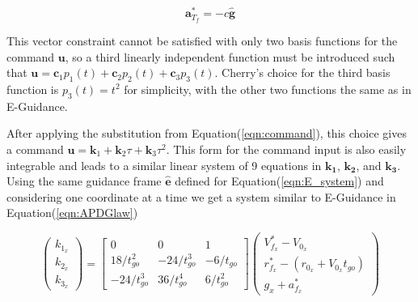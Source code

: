 \begin{equation}
\label{eqn:constraint_ag}
\bm{a}^*_{T_f} = -c\bm{\hat{g}}
\end{equation}

This vector constraint cannot be satisfied with only two basis functions for the command $\bm{u}$, so a third linearly independent function must be introduced such that $\bm{u} = \bm{c}_1 p_1(t) +\bm{c}_2 p_2(t) + \bm{c}_3 p_3(t)$. Cherry's choice for the third basis function is $p_3(t) = t^2$ for simplicity, with the other two functions the same as in E-Guidance.

After applying the substitution from Equation\:(\ref{eqn:command}), this choice gives a command $\bm{u} = \bm{k}_1+\bm{k}_2 \tau + \bm{k}_3 \tau^2$. This form for the command input is also easily integrable and leads to a similar linear system of 9 equations in $\bm{k_1}$, $\bm{k_2}$, and $\bm{k_3}$. Using the same guidance frame $\hat{\bm{e}}$ defined for Equation\:(\ref{eqn:E_system}) and considering one coordinate at a time we get a system similar to E-Guidance in Equation\:(\ref{eqn:APDGlaw})

\begin{equation}
\label{eqn:APDGlaw}
\begin{pmatrix}
k_{1_x} \\
k_{2_x} \\
k_{3_x}
\end{pmatrix}
= 
\begin{bmatrix}
0 & 0 & 1 \\
18/t_{go}^2 & -24/t_{go}^3 & -6/t_{go}\\
-24/t_{go}^3 & 36/t_{go}^4 & 6/t_{go}^2
\end{bmatrix}
\begin{pmatrix}
V_{f_x}^* - V_{0_x} \\ 
r_{f_x}^* - (r_{0_x} + V_{0_x}t_{go}) \\
g_x + a_{f_x}^*
\end{pmatrix}
\end{equation}


